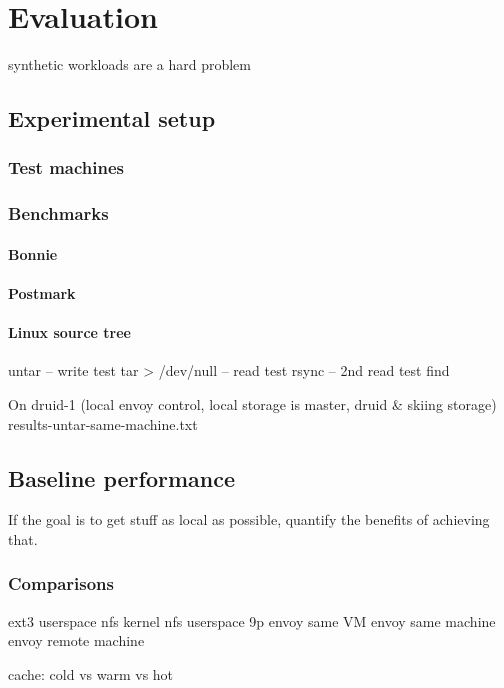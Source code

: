 \chapter{Evaluation}
synthetic workloads are a hard problem \cite{ganger95}
\section{Experimental setup}

\subsection{Test machines}

\subsection{Benchmarks}

\subsubsection{Bonnie}
\subsubsection{Postmark}

\subsubsection{Linux source tree}
untar -- write test
tar > /dev/null -- read test
rsync -- 2nd read test
find

On druid-1 (local envoy control, local storage is master, druid \& skiing storage)
results-untar-same-machine.txt



\section{Baseline performance}

If the goal is to get stuff as local as possible, quantify the benefits of achieving that.

\subsection{Comparisons}

ext3
userspace nfs
kernel nfs
userspace 9p
envoy same VM
envoy same machine
envoy remote machine

cache: cold vs warm vs hot

